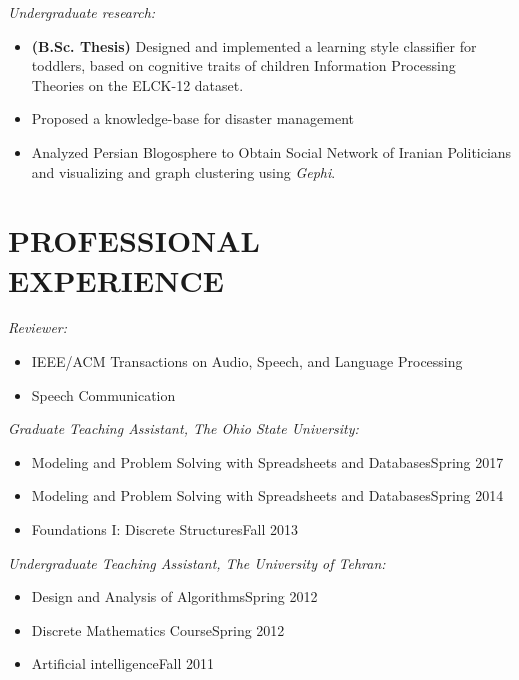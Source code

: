 \documentclass[margin, 10pt]{res}
\begin{document}
\begin{resume}
\begin{itemize}
\end{itemize}

\textit{Undergraduate research:}
\begin{itemize}
\item \textbf{(B.Sc. Thesis)} Designed and implemented a learning style classifier for toddlers, based on cognitive traits of children Information Processing Theories on the ELCK-12 dataset.
\item Proposed a knowledge-base for disaster management
\item Analyzed Persian Blogosphere to Obtain Social Network of Iranian Politicians and visualizing and graph clustering using \textit{Gephi}.
\end{itemize}

\section{PROFESSIONAL \\ EXPERIENCE}
\textit{Reviewer:}
\begin{itemize}
\item IEEE/ACM Transactions on Audio, Speech, and Language Processing
\item Speech Communication
\end{itemize}

\textit{Graduate Teaching Assistant, The Ohio State University:}
\begin{itemize}
\item Modeling and Problem Solving with Spreadsheets and Databases\hfill {\footnotesize Spring 2017}
\item Modeling and Problem Solving with Spreadsheets and Databases\hfill {\footnotesize Spring 2014}
\item Foundations I: Discrete Structures\hfill {\footnotesize Fall 2013}
\end{itemize}
\textit{Undergraduate Teaching Assistant, The University of Tehran:}
\begin{itemize}
\item Design and Analysis of Algorithms\hfill {\footnotesize Spring 2012}
\item Discrete Mathematics Course\hfill {\footnotesize Spring 2012}
\item Artificial intelligence\hfill {\footnotesize Fall 2011}
\end{itemize}




\end{resume}
\end{document}
